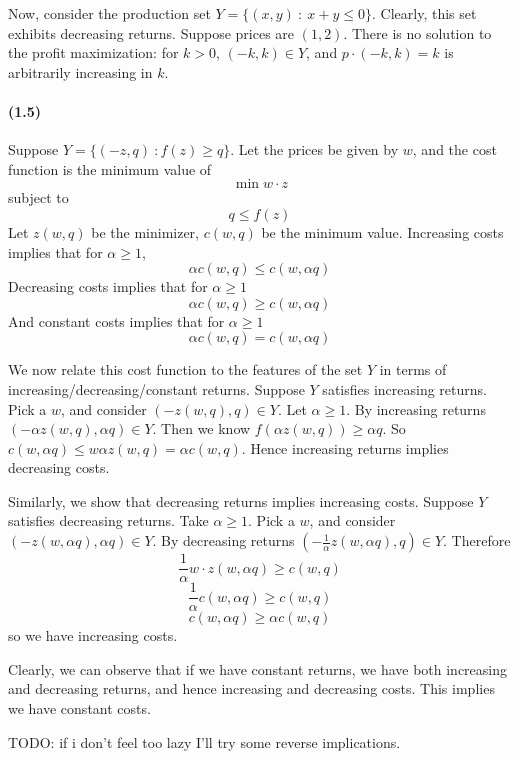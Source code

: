 \documentclass[10pt,letter]{article}
\begin{document}
Now, consider the production set $Y = \{(x,y) \ : \ x + y \le 0 \}$. Clearly, this set exhibits decreasing returns. Suppose prices are $(1, 2)$. There is no solution to the profit maximization: for $k > 0$, $(-k, k) \in Y$, and $p \cdot (-k, k) = k$ is arbitrarily increasing in $k$.
\paragraph{(1.5)}
Suppose $Y = \{ (-z, q) \ : f(z) \ge q \} $. Let the prices be given by $w$, and the cost function is the minimum value of
\[ \min w \cdot z \]
subject to
\[ q \le f(z) \]
Let $z(w,q)$ be the minimizer, $c(w,q)$ be the minimum value.
Increasing costs implies that for $\alpha \ge 1$,
\[ \alpha c(w, q) \le  c(w,\alpha q) \]
Decreasing costs implies that for $\alpha \ge 1$
\[ \alpha c(w, q) \ge  c(w,\alpha q) \]
And constant costs implies that for $\alpha \ge 1$
\[ \alpha c(w, q) =  c(w,\alpha q) \]

We now relate this cost function to the features of the set $Y$ in terms of increasing/decreasing/constant returns.
Suppose $Y$ satisfies increasing returns. Pick a $w$, and consider $(-z(w,q), q) \in Y$. Let $\alpha \ge 1$. By increasing returns $(-\alpha z(w,q), \alpha q) \in Y$. Then we know $f(\alpha z(w,q)) \ge \alpha q$. So $c(w, \alpha q) \le w \alpha z(w,q) = \alpha c(w,q)$. Hence increasing returns implies decreasing costs.

Similarly, we show that decreasing returns implies increasing costs. Suppose $Y$ satisfies decreasing returns. Take $\alpha \ge 1$. Pick a $w$, and consider $(-z(w,\alpha q), \alpha q) \in Y$. By decreasing returns $(-\frac{1}{\alpha}z(w,\alpha q), q) \in Y$. Therefore
\[ \frac{1}{\alpha} w \cdot z(w, \alpha q) \ge c(w, q) \]
\[ \frac{1}{\alpha} c(w, \alpha q) \ge c(w, q) \]
\[ c(w, \alpha q) \ge \alpha c(w, q) \]
so we have increasing costs.

Clearly, we can observe that if we have constant returns, we have both increasing and decreasing returns, and hence increasing and decreasing costs. This implies we have constant costs.

TODO: if i don't feel too lazy I'll try some reverse implications.
\end{document}
